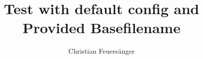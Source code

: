 


\author{Christian Feuers\"anger}
\title{Test with default config and Provided Basefilename}


\maketitle



